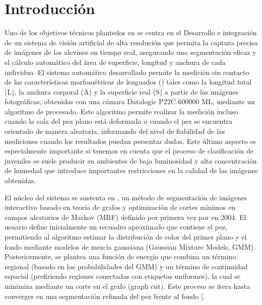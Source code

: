 \documentclass[a4paper,10pt,spanish]{jupyterBook}
\begin{document}
\section{Introducción}
\label{\detokenize{content/01/Imagen:introduccion}}
\sphinxAtStartPar
Uno de los objetivos técnicos plantedos en  se centra en el Desarrollo e integración de un sistema de visión artificial de alta resolución que permita la captura precisa de imágenes de los alevines en tiempo real, asegurando una segmentación eficaz y el cálculo automático del área de superficie, longitud y anchura de cada individuo. El sistema automático desarrollado permite la medición sin contacto de las características morfométricas de lenguados () tales como la longitud total (L), la anchura corporal (A) y la superficie real (S) a partir de las imágenes fotográficas, obtenidas con una cámara Datalogic P22C 600\sphinxhyphen{}000 ML, mediante un algoritmo de procesado. Este algoritmo permite realizar la medición incluso cuando la cola del pez plano está deformada o cuando el pez se encuentra orientado de manera aleatoria, informando del nivel de fiabilidad de las mediciones cuando los resultados puedan persentar dudas. Este último aspecto es especialmente importante si tenemos en cuenta que el proceso de clasificación de juveniles se suele producir en ambientes de baja luminosidad y alta concentración de humedad que introduce importantes restricciones en la calidad de las imágenes obtenidas.

\sphinxAtStartPar
El núcleo del sistema se sustenta en , un método de segmentación de imágenes interactivo basado en teoría de grafos y optimización de cortes mínimos en campos aleatorios de Markov (MRF) definido por primera vez por  en 2004. El usuario define inicialmente un recuadro aproximado que contiene el pez, permitiendo al algoritmo estimar la distribución de color del primer plano y el fondo mediante modelos de mezcla gaussiana (Gaussian Mixture Models, GMM). Posteriormente, se plantea una función de energía que combina un término regional (basado en las probabilidades del GMM) y un término de continuidad espacial (prefiriendo regiones conectadas con etiquetas uniformes), la cual se minimiza mediante un corte en el grafo (graph cut). Este proceso se itera hasta converger en una segmentación refinada del pez frente al fondo {[}\sphinxhref{https://doi.org/10.1016/j.jksuci.2020.07.005}{Alsmadi et al., 2022}{]}.
\end{document}

